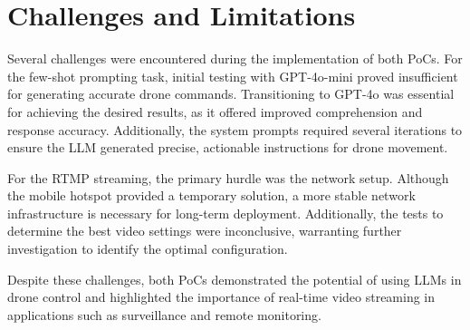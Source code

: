 \section{Challenges and Limitations}
Several challenges were encountered during the implementation of both \acp{PoC}. For the few-shot prompting task, initial testing with GPT-4o-mini proved insufficient for generating accurate drone commands. 
Transitioning to GPT-4o was essential for achieving the desired results, as it offered improved comprehension and response accuracy. 
Additionally, the system prompts required several iterations to ensure the \ac{LLM} generated precise, actionable instructions for drone movement.

For the \ac{RTMP} streaming, the primary hurdle was the network setup. Although the mobile hotspot provided a temporary solution, a more stable network infrastructure is necessary for long-term deployment. 
Additionally, the tests to determine the best video settings were inconclusive, warranting further investigation to identify the optimal configuration.

Despite these challenges, 
both \acp{PoC} demonstrated the potential of using \acp{LLM} in drone control and highlighted the importance of real-time video streaming in applications such as surveillance and remote monitoring.
